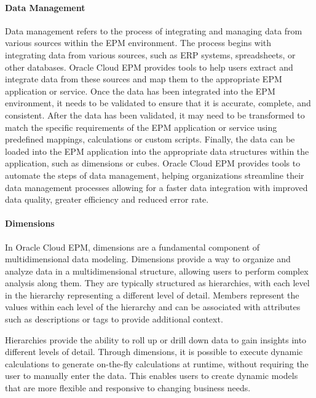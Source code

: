\documentclass[12pt,a4paper,openright,twoside]{book}
\begin{document}
\paragraph{Data Management}

Data management refers to the process of integrating and managing data from various sources within the EPM environment. 
%
The process begins with integrating data from various sources, such as ERP systems, spreadsheets, or other databases. 
%
Oracle Cloud EPM provides tools to help users extract and integrate data from these sources and map them to the appropriate EPM application or service.
%
Once the data has been integrated into the EPM environment, it needs to be validated to ensure that it is accurate, complete, and consistent. 
%
After the data has been validated, it may need to be transformed to match the specific requirements of the EPM application or service using predefined mappings, calculations or custom scripts.
%
Finally, the data can be loaded into the EPM application into the appropriate data structures within the application, such as dimensions or cubes. 
%
Oracle Cloud EPM provides tools to automate the steps of data management,  helping organizations streamline their data management processes allowing for a faster data integration with improved data quality, greater efficiency and reduced error rate.

\paragraph{Dimensions}

In Oracle Cloud EPM, dimensions are a fundamental component of multidimensional data modeling. 
%
Dimensions provide a way to organize and analyze data in a multidimensional structure, allowing users to perform complex analysis along them. 
%
They are typically structured as hierarchies, with each level in the hierarchy representing a different level of detail. 
%
Members represent the values within each level of the hierarchy and can be associated with attributes such as descriptions or tags to provide additional context. 

Hierarchies provide the ability to roll up or drill down data to gain insights into different levels of detail. 
%
Through dimensions, it is possible to execute dynamic calculations to generate on-the-fly calculations at runtime, without requiring the user to manually enter the data. 
%
This enables users to create dynamic models that are more flexible and responsive to changing business needs.
\end{document}

